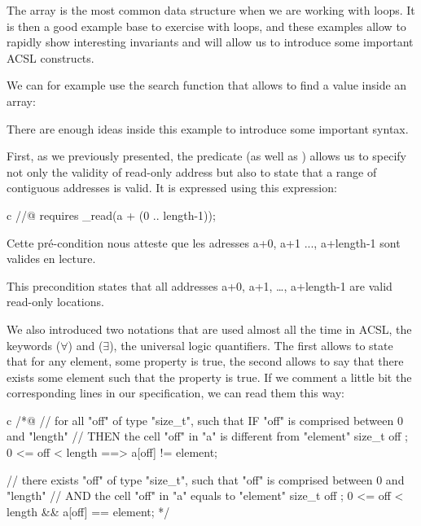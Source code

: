 

The array is the most common data structure when we are working with loops.
It is then a good example base to exercise with loops, and these
examples allow to rapidly show interesting invariants and will allow us
to introduce some important ACSL constructs.



We can for example use the search function that allows to find a value
inside an array:





There are enough ideas inside this example to introduce some important
syntax.



First, as we previously presented, the
 predicate (as well as
) allows us to specify not only the
validity of read-only address but also to state that a range of
contiguous addresses is valid. It is expressed using this expression:



\begin{CodeBlock}{c}
//@ requires \valid_read(a + (0 .. length-1));
\end{CodeBlock}



Cette pré-condition nous atteste que les adresses a+0, a+1 ..., a+length-1 sont
valides en lecture.



This precondition states that all addresses a+0, a+1, \ldots{},
a+length-1 are valid read-only locations.

We also introduced two notations that are used almost all the time in
ACSL, the keywords  ($\forall$) and
 ($\exists$), the universal logic
quantifiers. The first allows to state that for any element, some
property is true, the second allows to say that there exists some
element such that the property is true. If we comment a little bit the
corresponding lines in our specification, we can read them this way:


\begin{CodeBlock}{c}
/*@
// for all "off" of type "size_t", such that IF "off" is comprised between 0 and "length"
//                                 THEN the cell "off" in "a" is different from "element"
\forall size_t off ; 0 <= off < length ==> a[off] != element;

// there exists "off" of type "size_t", such that "off" is comprised between 0 and "length"
//                                      AND the cell "off" in "a" equals to "element"
\exists size_t off ; 0 <= off < length && a[off] == element;
*/
\end{CodeBlock}



